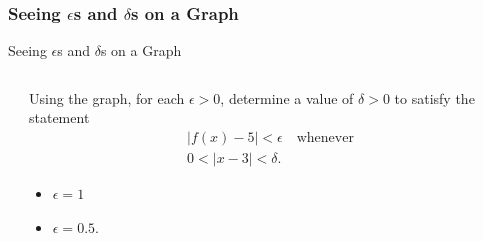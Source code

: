 \documentclass[cal1spr16Lectures.tex]{subfiles}
\begin{document}
\subsubsection{Seeing $\epsilon$s and $\delta$s on a Graph}

\begin{frame}{\small Seeing $\epsilon$s and $\delta$s on a Graph}\footnotesize
\begin{ex}
\begin{columns}[T]
	\begin{column}{.36\textwidth}
	\end{column}
	\begin{column}{.5\textwidth}
		Using the graph, for each $\epsilon >0$, determine a value of $\delta>0$ to satisfy the statement 
		\begin{multline*}|f(x)-5|<\epsilon\quad\text{whenever} \\
			0<|x-3|<\delta.\end{multline*}  
		\vspace{-1.5pc}
		\begin{itemize}
		\item[(a) ] $\epsilon=1$ 
		\item[(b) ] $\epsilon=0.5$.
		\end{itemize}
	\end{column}
\end{columns}
\end{ex}
\end{frame} 
\end{document}
